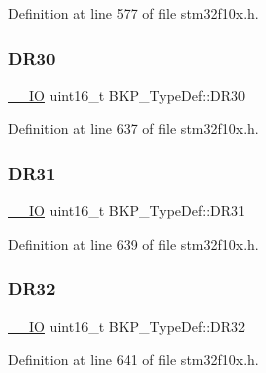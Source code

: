 Definition at line 577 of file stm32f10x.\+h.

\mbox{\label{struct_b_k_p___type_def_a7413138b9d21280f51975d9f80c66826}} 
\subsubsection{\texorpdfstring{D\+R30}{DR30}}
{\footnotesize\ttfamily \hyperlink{core__sc300_8h_aec43007d9998a0a0e01faede4133d6be}{\+\_\+\+\_\+\+IO} uint16\+\_\+t B\+K\+P\+\_\+\+Type\+Def\+::\+D\+R30}



Definition at line 637 of file stm32f10x.\+h.

\mbox{\label{struct_b_k_p___type_def_a59e675eaee3b1035123bc6d21a19e153}} 
\subsubsection{\texorpdfstring{D\+R31}{DR31}}
{\footnotesize\ttfamily \hyperlink{core__sc300_8h_aec43007d9998a0a0e01faede4133d6be}{\+\_\+\+\_\+\+IO} uint16\+\_\+t B\+K\+P\+\_\+\+Type\+Def\+::\+D\+R31}



Definition at line 639 of file stm32f10x.\+h.

\mbox{\label{struct_b_k_p___type_def_af55d82fdc7570503f812dc3ba895ed61}} 
\subsubsection{\texorpdfstring{D\+R32}{DR32}}
{\footnotesize\ttfamily \hyperlink{core__sc300_8h_aec43007d9998a0a0e01faede4133d6be}{\+\_\+\+\_\+\+IO} uint16\+\_\+t B\+K\+P\+\_\+\+Type\+Def\+::\+D\+R32}



Definition at line 641 of file stm32f10x.\+h.

\mbox{\label{struct_b_k_p___type_def_a8f15e1d81071ebe109d6558acd8f3d9a}} 
